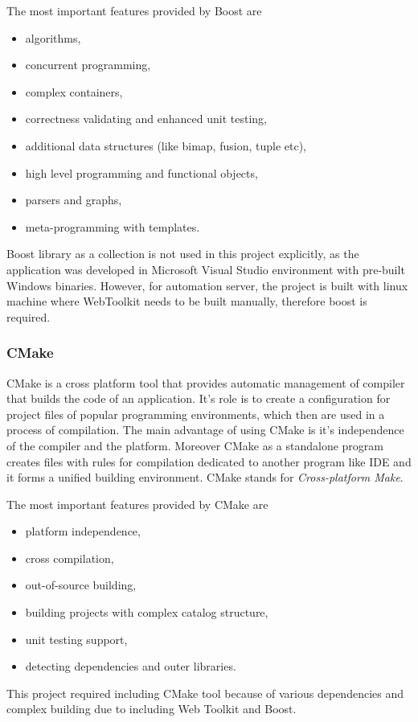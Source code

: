 \documentclass[a4paper,12pt]{book}
\newcommand\tab[1][1cm]{\hspace*{#1}}
\begin{document}
{{\bigskip
The most important features provided by Boost are
\begin{itemize}
	\item algorithms,
	\item concurrent programming,
	\item complex containers,
	\item correctness validating and enhanced unit testing,
	\item additional data structures (like bimap, fusion, tuple etc),
	\item high level programming and functional objects,
	\item parsers and graphs,
	\item meta-programming with templates.
\end{itemize}
	
Boost library as a collection is not used in this project explicitly, as the application was developed in Microsoft Visual Studio environment with pre-built Windows binaries. However, for automation server, the project is built with linux machine where WebToolkit needs to be built manually, therefore boost is required.
}
\subsubsection*{CMake}
{
\tab CMake is a cross platform tool that provides automatic management of compiler that builds the code of an application. It's role is to create a configuration for project files of popular programming environments, which then are used in a process of compilation. The main advantage of using CMake is it's independence of the compiler and the platform. Moreover CMake as a standalone program creates files with rules for compilation dedicated to another program like IDE and it forms a unified building environment. CMake stands for \textit{Cross-platform Make}.

\bigskip
The most important features provided by CMake are
\begin{itemize}
	\item platform independence,
	\item cross compilation,
	\item out-of-source building,
	\item building projects with complex catalog structure,
	\item unit testing support,
	\item detecting dependencies and outer libraries.
\end{itemize}
This project required including CMake tool because of various dependencies and complex building due to including Web Toolkit and Boost.  

}}
\end{document}
